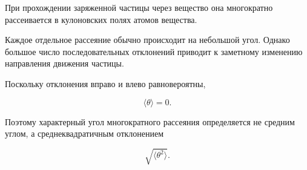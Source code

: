 \documentclass[../final.tex]{subfiles}
\begin{document}





При прохождении заряженной частицы через вещество
она многократно рассеивается в кулоновских полях атомов вещества.

Каждое отдельное рассеяние обычно происходит на небольшой угол.
Однако большое число последовательных отклонений приводит
к заметному изменению направления движения частицы.

Поскольку отклонения вправо и влево равновероятны,

\begin{equation*}
    \langle\theta\rangle=0.
\end{equation*}

Поэтому характерный угол многократного рассеяния определяется
не средним углом, а среднеквадратичным отклонением

\begin{equation*}
    \sqrt{\langle\theta^2\rangle}.
\end{equation*}


\end{document}
